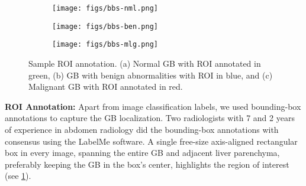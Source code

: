 \documentclass[10pt,twocolumn,letterpaper]{article}
\newcommand{\myfirstpara}[1]{\noindent \textbf{#1:}}
\begin{document}
\begin{figure}[h]
    \centering
     \begin{subfigure}[b]{0.32\linewidth}
		\centering
		\texttt{[image: figs/bbs-nml.png]}
		\caption{}
	\end{subfigure}
    \begin{subfigure}[b]{0.32\linewidth}
		\centering
		\texttt{[image: figs/bbs-ben.png]}
		\caption{}
	\end{subfigure}
    \begin{subfigure}[b]{0.32\linewidth}
		\centering
		\texttt{[image: figs/bbs-mlg.png]}
		\caption{}
	\end{subfigure}
   \caption{Sample ROI annotation. (a) Normal GB with ROI annotated in green, (b) GB with benign abnormalities with ROI in blue, and (c) Malignant GB with ROI annotated in red. }
    \label{fig:bb_sample}
\end{figure}
\myfirstpara{ROI Annotation} Apart from image classification labels, we used bounding-box annotations to capture the GB localization. Two radiologists with 7 and 2 years of experience in abdomen radiology did the bounding-box annotations with consensus using the LabelMe \cite{russell2008labelme} software. A single free-size axis-aligned rectangular box in every image, spanning the entire GB and adjacent liver parenchyma, preferably keeping the GB in the box's center, highlights the region of interest (see \cref{fig:bb_sample}).
\end{document}
